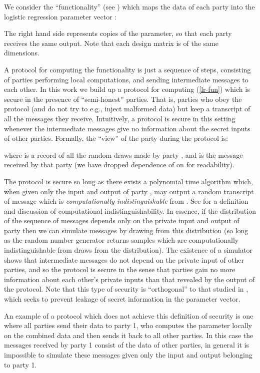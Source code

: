 \documentclass[11pt]{article}
\begin{document}
We consider the ``functionality'' (see \cite{goldreich}) which maps the data of each party into the logistic regression parameter vector :




The right hand side represents  copies of the parameter, so that each party receives the same output.  Note that each design matrix is of the same dimensions.

A protocol for computing the functionality is just a sequence of steps, consisting of parties performing local computations, and sending intermediate messages to each other. In this work we build up a protocol for computing (\ref{lr-fun}) which is secure in the presence of ``semi-honest'' parties.  That is, parties who obey the protocol (and do not try to e.g., inject malformed data) but keep a transcript of all the messages they receive.  Intuitively, a protocol is secure in this setting whenever the intermediate messages give no information about the secret inputs of other parties.  Formally, the ``view'' of the  party during the protocol is:


where  is a record of all the random draws made by party , and  is the  message received by that party (we have dropped dependence of  on  for readability).

The protocol is secure so long as there exists a polynomial time algorithm which, when given only the input and output of party , may output a random transcript of message which is \emph{computationally indistinguishable} from .   See  \citet{goldreich} for a definition and discussion of computational indistinguishability.  In essence, if the distribution of the sequence of messages depends only on the private input and output of party  then we can simulate messages by drawing from this distribution (so long as the random number generator returns samples which are computationally indistinguishable from draws from the distribution).  The existence of a simulator shows that intermediate messages do not depend on the private input of other parties, and so the protocol is secure in the sense that parties gain no more information about each other's private inputs than that revealed by the output of the protocol.  Note that this type of security is ``orthogonal'' to that studied in \citet{Chaudhuri}, which seeks to prevent leakage of secret information in the parameter vector.

An example of a protocol which does not achieve this definition of security is one where all parties send their data to party 1, who computes the parameter locally on the combined data and then sends it back to all other parties.  In this case the messages received by party 1 consist of the data of other parties, in general it is impossible to simulate these messages given only the input and output belonging to party 1.
\end{document}
